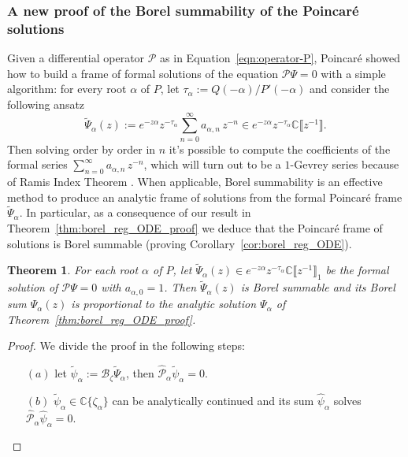 \documentclass{article}
\newcommand{\C}{\mathbb{C}}
\newcommand{\series}[1]{\tilde{#1}}
\newcommand{\borel}{\mathcal{B}}
\theoremstyle{definition}
\theoremstyle{plain}
\newtheorem{theorem}{Theorem}[section]
\begin{document}
{\subsubsection{A new proof of the Borel summability of the Poincar\'{e} solutions}\label{sec:new-summability-proof}
Given a differential operator $\mathcal{P}$ as in Equation~\eqref{eqn:operator-P}, Poincar\'e showed how to build a frame of formal solutions of the equation $\mathcal{P}\Psi=0$ with a simple algorithm: for every root $\alpha$ of $P$, let $\tau_\alpha:=Q(-\alpha)/P'(-\alpha)$ and consider the following ansatz
\begin{equation}
    \tilde{\Psi}_\alpha(z):=e^{-z\alpha}z^{-\tau_\alpha}\sum_{n=0}^\infty a_{\alpha,n}\, z^{-n}\in e^{-z\alpha} z^{-\tau_\alpha}\C\llbracket z^{-1}\rrbracket.
\end{equation}
Then solving order by order in $n$ it's possible to compute the coefficients of the formal series $\sum_{n=0}^\infty a_{\alpha,n}\, z^{-n}$, which will turn out to be a $1$-Gevrey series because of Ramis
Index Theorem \cite{ramis_index}. When applicable, Borel summability is an effective method to produce an analytic frame of solutions from the formal Poincar\'e frame $\tilde{\Psi}_\alpha$. In particular, as a consequence of our result in Theorem~\ref{thm:borel_reg_ODE_proof} we deduce that the Poincar\'e frame of solutions is Borel summable (proving Corollary~\ref{cor:borel_reg_ODE}).
\begin{theorem}\label{thm2-dim}
For each root $\alpha$ of $P$, let $\tilde{\Psi}_\alpha(z)\in e^{-z\alpha} z^{-\tau_\alpha}\C\llbracket z^{-1}\rrbracket_1$ be the formal solution of $\mathcal{P}\Psi=0$ with $a_{\alpha,0}=1$. Then $\series{\Psi}_\alpha(z)$ is Borel summable and its Borel sum $\hat{\Psi}_\alpha(z)$ is proportional to the analytic solution $\Psi_\alpha$ of Theorem~\ref{thm:borel_reg_ODE_proof}. 
\end{theorem}
\begin{proof}
We divide the proof in the following steps:
\begin{itemize}
\item[$(a)$] let $\series{\psi}_\alpha:=\borel_{\zeta}\series{\Psi}_\alpha$, then $\hat{\mathcal{P}}_\alpha\series{\psi}_\alpha=0$.
\item[$(b)$] $\tilde{\psi}_\alpha\in\C\lbrace\zeta_\alpha\rbrace$ can be analytically continued and its sum $\hat{\psi}_\alpha$ solves $\hat{\mathcal{P}}_\alpha\hat{\psi}_\alpha=0$. 

\end{itemize}
\end{proof}}
\end{document}
